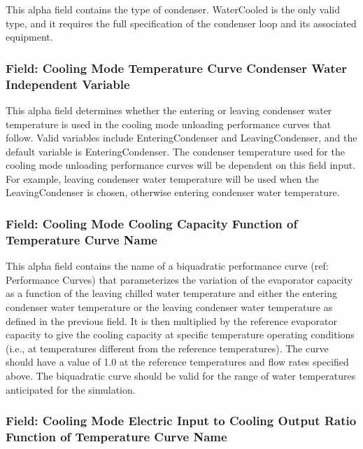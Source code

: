 This alpha field contains the type of condenser. WaterCooled is the only valid type, and it requires the full specification of the condenser loop and its associated equipment.

\subsubsection{Field: Cooling Mode Temperature Curve Condenser Water Independent Variable}\label{field-cooling-mode-temperature-curve-condenser-water-independent-variable}

This alpha field determines whether the entering or leaving condenser water temperature is used in the cooling mode unloading performance curves that follow. Valid variables include EnteringCondenser and LeavingCondenser, and the default variable is EnteringCondenser. The condenser temperature used for the cooling mode unloading performance curves will be dependent on this field input. For example, leaving condenser water temperature will be used when the LeavingCondenser is chosen, otherwise entering condenser water temperature.

\subsubsection{Field: Cooling Mode Cooling Capacity Function of Temperature Curve Name}\label{field-cooling-mode-cooling-capacity-function-of-temperature-curve-name}

This alpha field contains the name of a biquadratic performance curve (ref: Performance Curves) that parameterizes the variation of the evaporator capacity as a function of the leaving chilled water temperature and either the entering condenser water temperature or the leaving condenser water temperature as defined in the previous field. It is then multiplied by the reference evaporator capacity to give the cooling capacity at specific temperature operating conditions (i.e., at temperatures different from the reference temperatures). The curve should have a value of 1.0 at the reference temperatures and flow rates specified above. The biquadratic curve should be valid for the range of water temperatures anticipated for the simulation.

\subsubsection{Field: Cooling Mode Electric Input to Cooling Output Ratio Function of Temperature Curve Name}\label{field-cooling-mode-electric-input-to-cooling-output-ratio-function-of-temperature-curve-name}

